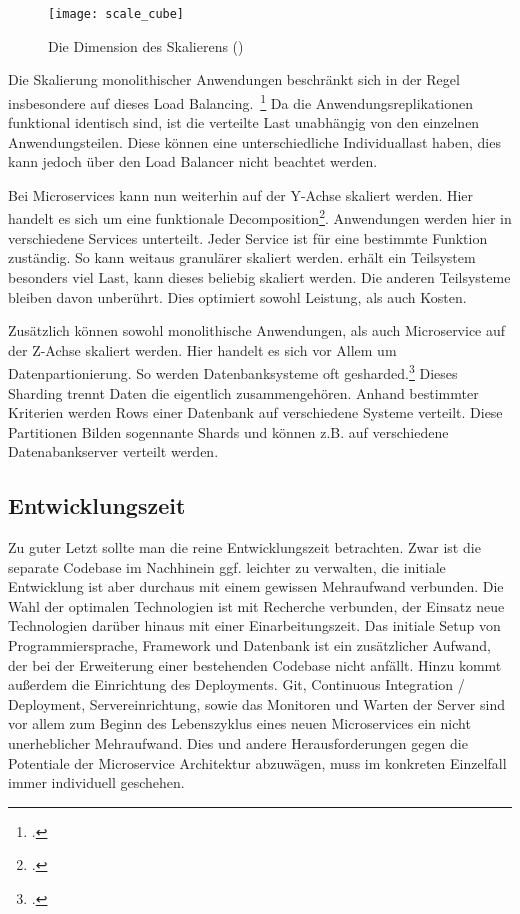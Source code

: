 \begin{figure}[!ht]
    \caption{Die Dimension des Skalierens (\cite{abbott2009art})}
    \label{fig:scalecube}
    \texttt{[image: scale\_cube]}
\end{figure}

Die Skalierung monolithischer Anwendungen beschränkt sich in der Regel insbesondere auf dieses Load Balancing.~\footcite[vgl.][]{infaktuell} 
Da die Anwendungsreplikationen funktional identisch sind, ist die verteilte Last  unabhängig von den einzelnen Anwendungsteilen. Diese können eine unterschiedliche Individuallast haben, dies kann jedoch über den Load Balancer nicht beachtet werden.

Bei Microservices kann nun weiterhin auf der Y-Achse skaliert werden. Hier handelt es sich um eine funktionale Decomposition\footcite[][]{abbott2009art}. Anwendungen werden hier in verschiedene Services unterteilt. Jeder Service ist für eine bestimmte Funktion zuständig. So kann weitaus granulärer skaliert werden. erhält ein Teilsystem besonders viel Last, kann dieses beliebig skaliert werden. Die anderen Teilsysteme bleiben davon unberührt. Dies optimiert sowohl Leistung, als auch Kosten.

Zusätzlich können sowohl monolithische Anwendungen, als auch Microservice auf der Z-Achse skaliert werden. Hier handelt es sich vor Allem um Datenpartionierung. So werden Datenbanksysteme oft gesharded.\footcite[][]{microsoft:sharding} Dieses Sharding trennt Daten die eigentlich zusammengehören. Anhand bestimmter Kriterien werden Rows einer Datenbank auf verschiedene Systeme verteilt. Diese Partitionen Bilden sogennante Shards und können z.B. auf verschiedene Datenabankserver verteilt werden.

\subsection{Entwicklungszeit}
Zu guter Letzt sollte man die reine Entwicklungszeit betrachten. Zwar ist die separate Codebase im Nachhinein ggf. leichter zu verwalten, die initiale Entwicklung ist aber durchaus mit einem gewissen Mehraufwand verbunden. Die Wahl der optimalen Technologien ist mit Recherche verbunden, der Einsatz neue Technologien darüber hinaus mit einer Einarbeitungszeit. Das initiale Setup von Programmiersprache, Framework und Datenbank ist ein zusätzlicher Aufwand, der bei der Erweiterung einer bestehenden Codebase nicht anfällt. Hinzu kommt außerdem die Einrichtung des Deployments. Git, Continuous Integration / Deployment, Servereinrichtung, sowie das Monitoren und Warten der Server sind vor allem zum Beginn des Lebenszyklus eines neuen Microservices ein nicht unerheblicher Mehraufwand. Dies und andere Herausforderungen gegen die Potentiale der Microservice Architektur abzuwägen, muss im konkreten Einzelfall immer individuell geschehen.

